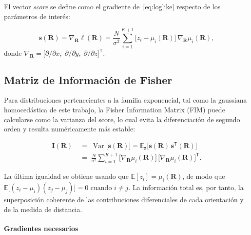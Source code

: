 \documentclass[lettersize,journal]{IEEEtran}
\begin{document}
El vector \emph{score} se define como el gradiente de~\eqref{eq:loglike} respecto de los parámetros de interés:

\[
\mathbf s(\mathbf R)
=
\nabla_{\mathbf R}\ell(\mathbf R)
=
\frac{N}{\sigma^{2}}
\sum_{i=1}^{K+1}
\bigl[z_i-\mu_i(\mathbf R)\bigr]\,
\nabla_{\mathbf R}\mu_i(\mathbf R),
\]
donde 
\(
\nabla_{\mathbf R}=\bigl[\partial/\partial x,\;
\partial/\partial y,\;
\partial/\partial z\bigr]^{\!\mathsf T}.
\)

\subsection{Matriz de Información de Fisher}

Para distribuciones pertenecientes a la familia exponencial, tal como la gaussiana homocedástica de este trabajo, la Fisher Information Matrix (FIM) puede calcularse como la varianza del score, lo cual evita la diferenciación de segundo orden y resulta numéricamente más estable:

\begin{align}
\mathbf I(\mathbf R)
&\;=\;\operatorname{Var}\!\bigl[\mathbf s(\mathbf R)\bigr]
= \mathbb E_{\mathbf z}\!
\bigl[\mathbf s(\mathbf R)\,\mathbf s^{\mathsf T}(\mathbf R)\bigr] \\
&\;=\;
\frac{N}{\sigma^{2}}
\sum_{i=1}^{K+1}
\bigl[\nabla_{\mathbf R}\mu_i(\mathbf R)\bigr]\,
\bigl[\nabla_{\mathbf R}\mu_i(\mathbf R)\bigr]^{\!\mathsf T}.
\label{eq:FIM_general}
\end{align}

La última igualdad se obtiene usando que $\mathbb E[z_i]=\mu_i(\mathbf R)$, de modo que $\mathbb E\bigl[(z_i-\mu_i)(z_j-\mu_j)\bigr]=0$ cuando $i\neq j$.  La información total es, por tanto, la superposición coherente de las contribuciones diferenciales de cada orientación y de la medida de distancia.

\paragraph*{Gradientes necesarios}
\end{document}
